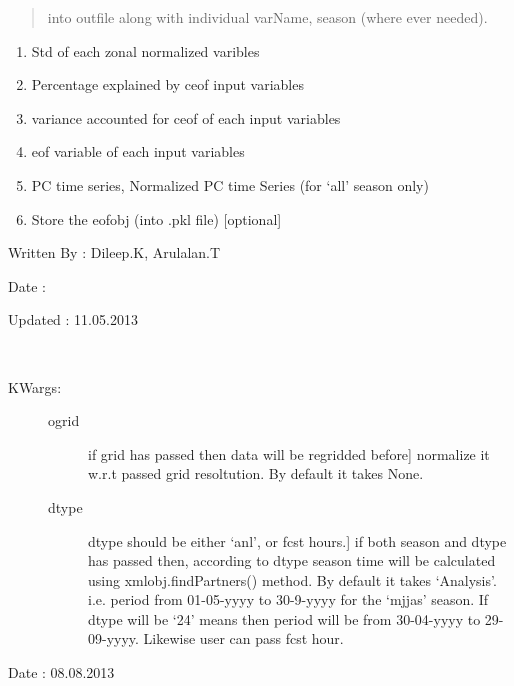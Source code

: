 \documentclass[letterpaper,10pt,english]{sphinxmanual}
\begin{document}
\begin{fulllineitems}
\begin{description}
\begin{quote}
into outfile along with individual varName, season
(where ever needed).
\end{quote}
\begin{enumerate}
\item {} 
Std of each zonal normalized varibles

\item {} 
Percentage explained by ceof input variables

\item {} 
variance accounted for ceof of each input variables

\item {} 
eof variable of each input variables

\item {} 
PC time series, Normalized PC time Series (for `all' season only)

\item {} 
Store the eofobj (into .pkl file) {[}optional{]}

\end{enumerate}

\end{description}

Written By : Dileep.K, Arulalan.T

Date :

Updated : 11.05.2013

\end{fulllineitems}


\begin{fulllineitems}
\label{mjo:ceof_diag.genProjectedPcts}~\begin{description}
\item[{KWargs:}] \leavevmode\begin{description}
\item[{ogrid}] \leavevmode{[}if grid has passed then data will be regridded before{]}
normalize it w.r.t passed grid resoltution. By default it
takes None.

\item[{dtype}] \leavevmode{[}dtype should be either `anl', or fcst hours.{]}
if both season and dtype has passed then, according to dtype
season time will be calculated using xmlobj.findPartners()
method. By default it takes `Analysis'.
i.e. period from 01-05-yyyy to 30-9-yyyy for the `mjjas' season.
If dtype will be `24' means then period will be from 30-04-yyyy
to 29-09-yyyy. Likewise user can pass fcst hour.

\end{description}

\end{description}

Date : 08.08.2013

\end{fulllineitems}
\end{document}
